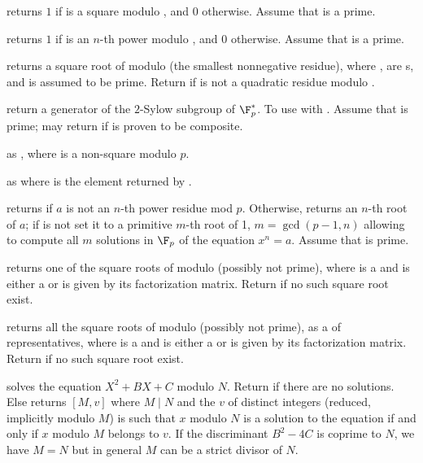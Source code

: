  returns $1$ if  is a square
modulo , and $0$ otherwise. Assume that  is a prime.

 returns $1$ if  is an
$n$-th power modulo , and $0$ otherwise. Assume that  is a prime.

 returns a square root of  modulo
 (the smallest nonnegative residue), where ,  are
s, and  is assumed to be prime. Return 
if  is not a quadratic residue modulo .

 return a generator of
the $2$-Sylow subgroup of $\F_p^*$. To use with .
Assume that  is prime; may return  if  is proven
to be composite.

 as , where  is a
non-square modulo $p$.

as  where  is the element returned by
.

returns  if $a$ is not an $n$-th power residue mod $p$.
Otherwise, returns an $n$-th root of $a$; if  is not 
set it to a primitive $m$-th root of 1, $m = \gcd(p-1,n)$ allowing to compute
all $m$ solutions in $\F_p$ of the equation $x^n = a$.
Assume that  is prime.

 returns one of the square roots of 
modulo  (possibly not prime), where  is a  and 
is either a  or is given by its factorization matrix.  Return
 if no such square root exist.

 returns all the square roots of 
modulo  (possibly not prime), as a  of representatives,
 where  is a  and  is either a  or is given by
its factorization matrix.  Return  if no such square root exist.

 solves the equation $X^2 + B X
+ C$ modulo $N$. Return  if there are no solutions. Else returns
 $[M, v]$ where $M \mid N$ and the  $v$ of distinct integers
(reduced, implicitly modulo $M$) is such that $x$ modulo $N$ is a solution to
the equation if and only if $x$ modulo $M$ belongs to $v$. If the
discriminant $B^2-4C$ is coprime to $N$, we have $M = N$ but in general $M$
can be a strict divisor of $N$.

